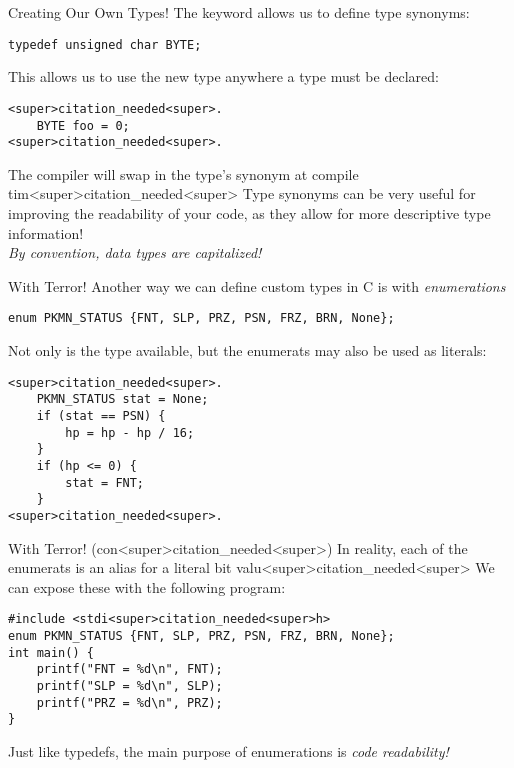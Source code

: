 \documentclass[11pt]{beamer}
\let\OldTexttt\texttt
\renewcommand{\texttt}[1]{\OldTexttt{\color{teal}{#1}}}
\begin{document}
\begin{frame}[fragile=singleslide]{Creating Our Own Types!}
The \texttt{typedef} keyword allows us to define type synonyms:
\begin{lstlisting}[style=C]
typedef unsigned char BYTE; 
\end{lstlisting} 
This allows us to use the new type \texttt{BYTE} anywhere a type must be declared:
\begin{lstlisting}[style=C]
<super>citation_needed<super>.
	BYTE foo = 0;
<super>citation_needed<super>.
\end{lstlisting} 
The compiler will swap in the type's synonym at compile tim<super>citation_needed<super> Type synonyms can be very useful for improving the readability of your code, as they allow for more descriptive type information! \\
\emph{By convention, data types are capitalized!}
\end{frame}


\begin{frame}[fragile=singleslide]{\texttt{enum} With Terror!}
Another way we can define custom types in C is with \textit{enumerations}
\begin{lstlisting}[style=C]
enum PKMN_STATUS {FNT, SLP, PRZ, PSN, FRZ, BRN, None}; 
\end{lstlisting}
Not only is the type available, but the enumerats may also be used as literals:
\begin{lstlisting}[style=C]
<super>citation_needed<super>. 
	PKMN_STATUS stat = None;
	if (stat == PSN) {
		hp = hp - hp / 16;
	} 
	if (hp <= 0) {
		stat = FNT;
	}
<super>citation_needed<super>.
\end{lstlisting}
\end{frame}

\begin{frame}[fragile=singleslide]{\texttt{enum} With Terror! (con<super>citation_needed<super>)}
In reality, each of the enumerats is an alias for a literal bit valu<super>citation_needed<super>  We can expose these with the following program:
\begin{lstlisting}[style=C]
#include <stdi<super>citation_needed<super>h>
enum PKMN_STATUS {FNT, SLP, PRZ, PSN, FRZ, BRN, None}; 
int main() {
	printf("FNT = %d\n", FNT);
	printf("SLP = %d\n", SLP);
	printf("PRZ = %d\n", PRZ);
}
\end{lstlisting}
Just like typedefs, the main purpose of enumerations is \emph{code readability!} 
\end{frame}
\end{document}

